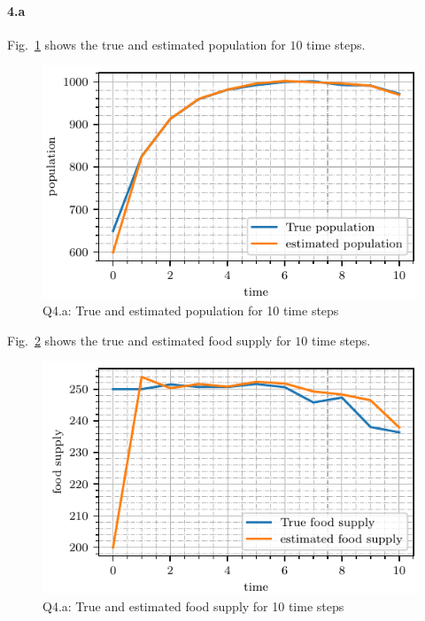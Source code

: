 \paragraph{4.a} Fig.~\ref{fig:q4_population} shows the true and estimated population for $10$ time steps.
\begin{figure}[!h]
	\centering
	\includegraphics[scale=1.0,trim={0cm 0cm 0cm 0cm},clip]{./code/generatedPlots/q4_population.pdf}
	\caption{Q4.a: True and estimated population for 10 time steps}
	\label{fig:q4_population}
\end{figure}
Fig.~\ref{fig:q4_food} shows the true and estimated food supply for $10$ time steps.
\begin{figure}[!h]
	\centering
	\includegraphics[scale=1.0,trim={0cm 0cm 0cm 0cm},clip]{./code/generatedPlots/q4_food.pdf}
	\caption{Q4.a: True and estimated food supply for 10 time steps}
	\label{fig:q4_food}
\end{figure}
